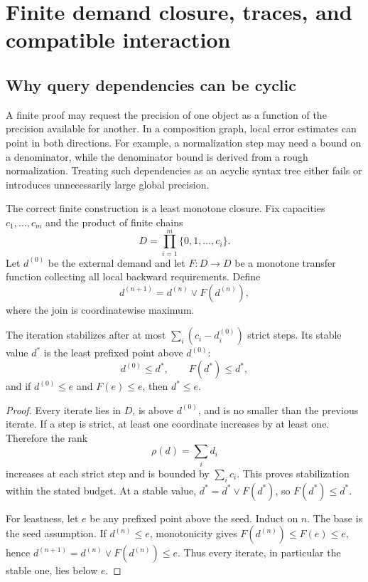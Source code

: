 \section{Finite demand closure, traces, and compatible interaction}

\subsection{Why query dependencies can be cyclic}

A finite proof may request the precision of one object as a function of the
precision available for another.  In a composition graph, local error estimates
can point in both directions.  For example, a normalization step may need a
bound on a denominator, while the denominator bound is derived from a rough
normalization.  Treating such dependencies as an acyclic syntax tree either
fails or introduces unnecessarily large global precision.

The correct finite construction is a least monotone closure.  Fix capacities
\(c_1,\ldots,c_m\) and the product of finite chains
\[
 D=\prod_{i=1}^m\{0,1,\ldots,c_i\}.
\]
Let \(d^{(0)}\) be the external demand and let \(F:D\to D\) be a monotone
transfer function collecting all local backward requirements.  Define
\[
 d^{(n+1)}=d^{(n)}\vee F(d^{(n)}),
\]
where the join is coordinatewise maximum.

\begin{theorem}
The iteration stabilizes after at most
\(\sum_i(c_i-d_i^{(0)})\) strict steps.  Its stable value \(d^*\) is the least
prefixed point above \(d^{(0)}\):
\[
 d^{(0)}\le d^*,\qquad F(d^*)\le d^*,
\]
and if \(d^{(0)}\le e\) and \(F(e)\le e\), then \(d^*\le e\).
\end{theorem}

\begin{proof}
Every iterate lies in \(D\), is above \(d^{(0)}\), and is no smaller than the
previous iterate.  If a step is strict, at least one coordinate increases by at
least one.  Therefore the rank
\[
  \rho(d)=\sum_i d_i
\]
increases at each strict step and is bounded by \(\sum_i c_i\).  This proves
stabilization within the stated budget.  At a stable value,
\(d^*=d^*\vee F(d^*)\), so \(F(d^*)\le d^*\).

For leastness, let \(e\) be any prefixed point above the seed.  Induct on
\(n\).  The base is the seed assumption.  If \(d^{(n)}\le e\), monotonicity
gives \(F(d^{(n)})\le F(e)\le e\), hence
\(d^{(n+1)}=d^{(n)}\vee F(d^{(n)})\le e\).  Thus every iterate, in particular
the stable one, lies below \(e\).
\end{proof}


